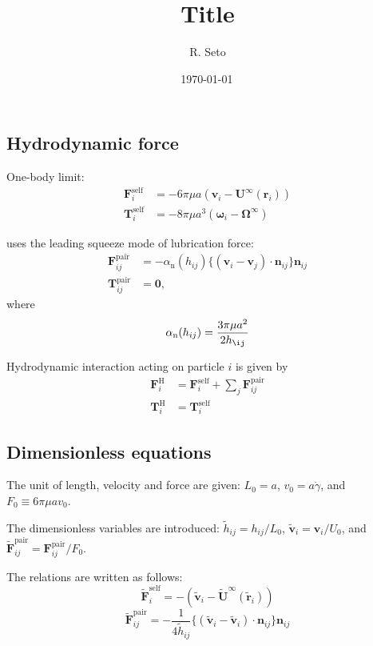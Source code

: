 \documentclass[12pt]{article}
\title{Title}
\date{\shortdate\today \, \ampmtime }
\author{R. Seto}
\begin{document}
\maketitle


\subsection*{Hydrodynamic force}

One-body limit:
\begin{align}
 \bm{F}_i^{\mathrm{self}} &= 
-6 \pi \mu a ( \bm{v}_i - \bm{U}^{\infty} (\bm{r}_i) ) \\
 \bm{T}_i^{\mathrm{self}} &= 
-8 \pi \mu a^3 ( \bm{\omega}_i - \bm{\Omega}^{\infty})
\end{align}

\citet{Melrose_2004a} uses the leading 
squeeze mode of lubrication force:
\begin{align}
 \bm{F}_{ij}^{\mathrm{pair}}
&=
- \alpha_{\mathrm{n}}(h_{ij})
\bigl\{
(\bm{v}_i - \bm{v}_j)
\cdot \bm{n}_{ij}
\bigr\}
\bm{n}_{ij} \\
 \bm{T}_{ij}^{\mathrm{pair}}
&=
\bm{0},
\end{align}
where
\begin{equation}
 \alpha_{\mathrm{n}}(h_{ij}) = 
\frac{3 \pi \mu a^2}{2 h_{\ij}}
\end{equation}

Hydrodynamic interaction acting on particle $i$
is given by
\begin{align}
\bm{F}_i^{\mathrm{H}}
&=
\bm{F}_i^{\mathrm{self}}
+
\sum_j
\bm{F}_{ij}^{\mathrm{pair}} \\
\bm{T}_i^{\mathrm{H}}
&=
\bm{T}_i^{\mathrm{self}}
\end{align}
\newpage
\subsection*{Dimensionless equations}

The unit of length, velocity and force 
are given:
$L_0 = a$,  $v_0 = a \dot{\gamma}$, and $F_0 \equiv 6 \pi \mu a v_0$.

The dimensionless variables are introduced:
$\tilde{h}_{ij} = h_{ij} / L_0$,
$\tilde{\bm{v}}_i = \bm{v}_i / U_0$,
and $\tilde{\bm{F}}_{ij}^{\mathrm{pair}} = \bm{F}_{ij}^{\mathrm{pair}} / F_0$.

The relations are written as follows:
\begin{equation}
 \tilde{\bm{F}}_i^{\mathrm{self}} = 
-( \tilde{\bm{v}}_i - 
\tilde{\bm{U}}^{\infty} 
(\tilde{\bm{r}}_i) )
\end{equation}
\begin{equation}
 \tilde{\bm{F}}_{ij}^{\mathrm{pair}}
= 
- \frac{1}{4 \tilde{h}_{ij}}
\bigl\{
(\tilde{\bm{v}}_i-
\tilde{\bm{v}}_i)\cdot
\bm{n}_{ij}
\bigr\}\bm{n}_{ij}
\end{equation}
\end{document}
